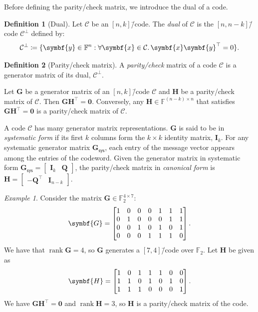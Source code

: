 \documentclass[version=last, paper=A4, parskip=half, oneside]{scrbook}
\theoremstyle{plain}
\theoremstyle{definition}
\newtheorem{definition}{Definition}
\theoremstyle{remark}
\newtheorem*{example}{Example}
\renewcommand*{\vec}{\symbf}
\newcommand*{\mat}{\symbf}
\newcommand*{\trans}{\top}%
\DeclareMathOperator{\rank}{rank}
\newcommand*{\FF}{\ensuremath{\mathbb{F}}}
\newcommand*{\sys}{\ensuremath{\mathsf{sys}}}
\begin{document}
Before defining the parity\-/check matrix, we introduce the dual of a code.

\begin{definition}[Dual]
  Let \(\mathcal{C}\) be an \([n, k]\)\=/code.  The \emph{dual} of
  \(\mathcal{C}\) is the \([n, n - k]\)\=/code \(\mathcal{C}^{\perp}\) defined
  by:
  \[
    \mathcal{C}^{\perp} \coloneqq
    \{\vec{y} \in \FF^n : \forall \vec{x} \in \mathcal{C}\ldotp \vec{x} \vec{y}^{\trans} = 0\}\text.
  \]
\end{definition}

\begin{definition}[Parity\-/check matrix]
  A \emph{parity\-/check} matrix of a code \(\mathcal{C}\) is a generator matrix
  of its dual, \(\mathcal{C}^{\perp}\).
\end{definition}

Let \(\mat{G}\) be a generator matrix of an \([n, k]\)\=/code \(\mathcal{C}\)
and \(\mat{H}\) be a parity\-/check matrix of \(\mathcal{C}\).  Then
\(\mat{G} \mat{H}^{\trans} = \vec{0}\).  Conversely, any
\(\mat{H} \in \FF^{(n - k) \times n}\) that satisfies
\(\mat{G} \mat{H}^{\trans} = \vec{0}\) is a parity\-/check matrix of
\(\mathcal{C}\).

A code \(\mathcal{C}\) has many generator matrix representations.  \(\mat{G}\)
is said to be in \emph{systematic form} if its first \(k\) columns form the
\(k \times k\) identity matrix, \(\mat{I}_k\).  For any systematic generator
matrix \(\mat{G}_{\sys}\), each entry of the message vector appears among the
entries of the codeword.  Given the generator matrix in systematic form
\(\mat{G}_{\sys} = \begin{bmatrix} \mat{I}_k & \mat{Q} \end{bmatrix}\), the
parity\-/check matrix in \emph{canonical form} is
\(\mat{H} = \begin{bmatrix} -\mat{Q}^{\trans} & \mat{I}_{n - k} \end{bmatrix}\).

\begin{example}
  Consider the matrix \(\mat{G} \in \FF_2^{4 \times 7}\):
  \[
    \mat{G} =
    \begin{bmatrix}
      1 & 0 & 0 & 0 & 1 & 1 & 1 \\
      0 & 1 & 0 & 0 & 0 & 1 & 1 \\
      0 & 0 & 1 & 0 & 1 & 0 & 1 \\
      0 & 0 & 0 & 1 & 1 & 1 & 0
    \end{bmatrix}\text.
  \]
  We have that \(\rank \mat{G} = 4\), so \(\mat{G}\) generates a
  \([7, 4]\)\=/code over \(\FF_2\).  Let \(\mat{H}\) be given as
  \[
    \mat{H} =
    \begin{bmatrix}
      1 & 0 & 1 & 1 & 1 & 0 & 0 \\
      1 & 1 & 0 & 1 & 0 & 1 & 0 \\
      1 & 1 & 1 & 0 & 0 & 0 & 1
    \end{bmatrix}\text.
  \]
  We have \(\mat{G} \mat{H}^{\trans} = \vec{0}\) and \(\rank \mat{H} = 3\), so
  \(\mat{H}\) is a parity\-/check matrix of the code.
\end{example}
\end{document}
